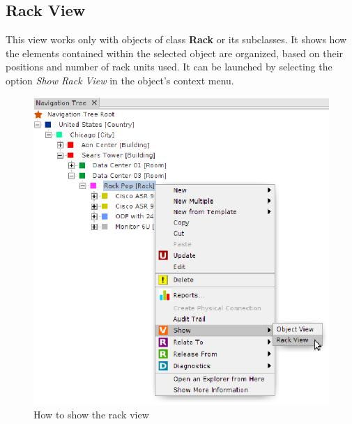 \documentclass[a4paper]{article}
\begin{document}
		\clearpage
		\subsection{Rack View} \label{sec:rack_view}
		This view works only with objects of class \textbf{Rack} or its subclasses. It shows how the elements contained within the selected object are organized, based on their positions and number of rack units used. It can be launched by selecting the option \textit{Show Rack View} in the object's context menu.
		\begin{figure}[h!]
			\centering
			\includegraphics[width=0.6\linewidth]{img/show_rack_view.png}
			\caption{How to show the rack view}
			\label{fig:rack_view_combobox}
		\end{figure}
		
\end{document}
